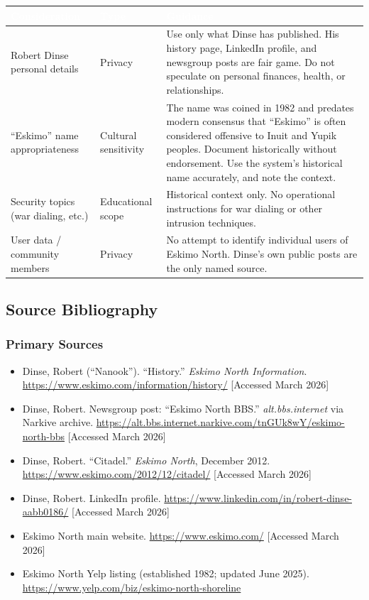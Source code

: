 \documentclass[11pt,letterpaper]{article}
\newcommand{\tableheader}[1]{\textbf{\sffamily\textcolor{white}{#1}}}
\begin{document}
\begin{center}
\begin{tabularx}{\textwidth}{L{4cm}L{2.5cm}X}
\toprule
{}
\tableheader{Consideration} & \tableheader{Type} & \tableheader{Guidance} \\
\midrule
Robert Dinse personal details & Privacy & Use only what Dinse has published. His history page, LinkedIn profile, and newsgroup posts are fair game. Do not speculate on personal finances, health, or relationships. \\
``Eskimo'' name appropriateness & Cultural sensitivity & The name was coined in 1982 and predates modern consensus that ``Eskimo'' is often considered offensive to Inuit and Yupik peoples. Document historically without endorsement. Use the system's historical name accurately, and note the context. \\
Security topics (war dialing, etc.) & Educational scope & Historical context only. No operational instructions for war dialing or other intrusion techniques. \\
User data / community members & Privacy & No attempt to identify individual users of Eskimo North. Dinse's own public posts are the only named source. \\
\bottomrule
\end{tabularx}
\end{center}

\subsection{Source Bibliography}

\subsubsection{Primary Sources}

\begin{itemize}[leftmargin=1.5em]
  \item Dinse, Robert (``Nanook''). ``History.'' \textit{Eskimo North Information}. \url{https://www.eskimo.com/information/history/} [Accessed March 2026]
  \item Dinse, Robert. Newsgroup post: ``Eskimo North BBS.'' \textit{alt.bbs.internet} via Narkive archive. \url{https://alt.bbs.internet.narkive.com/tnGUk8wY/eskimo-north-bbs} [Accessed March 2026]
  \item Dinse, Robert. ``Citadel.'' \textit{Eskimo North}, December 2012. \url{https://www.eskimo.com/2012/12/citadel/} [Accessed March 2026]
  \item Dinse, Robert. LinkedIn profile. \url{https://www.linkedin.com/in/robert-dinse-aabb0186/} [Accessed March 2026]
  \item Eskimo North main website. \url{https://www.eskimo.com/} [Accessed March 2026]
  \item Eskimo North Yelp listing (established 1982; updated June 2025). \url{https://www.yelp.com/biz/eskimo-north-shoreline}
\end{itemize}
\end{document}
